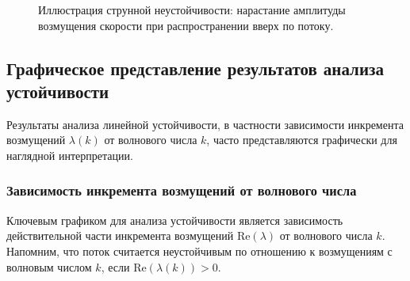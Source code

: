 \documentclass[12pt, a4paper]{article}
\begin{document}
\begin{figure}[h!]
	\centering
	\caption{Иллюстрация струнной неустойчивости: нарастание амплитуды возмущения скорости при распространении вверх по потоку.}
	\label{fig:string_instability_waves}
\end{figure}

\subsection{Графическое представление результатов анализа устойчивости}
\label{subsec:graphical_stability_analysis}

Результаты анализа линейной устойчивости, в частности зависимости инкремента возмущений $\lambda(k)$ от волнового числа $k$, часто представляются графически для наглядной интерпретации.

\subsubsection{Зависимость инкремента возмущений от волнового числа}
\label{subsubsec:lambda_vs_k}

Ключевым графиком для анализа устойчивости является зависимость действительной части инкремента возмущений $\text{Re}(\lambda)$ от волнового числа $k$. Напомним, что поток считается неустойчивым по отношению к возмущениям с волновым числом $k$, если $\text{Re}(\lambda(k)) > 0$.

\end{document}
